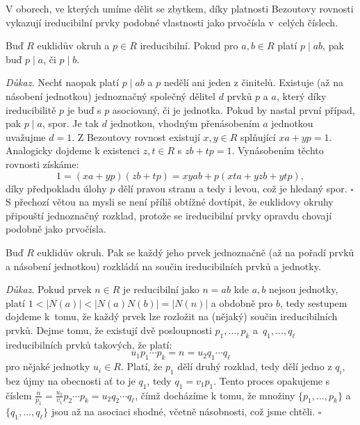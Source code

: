 \documentclass [12pt]{report}
\begin{document}
V oborech, ve kterých umíme dělit se zbytkem, díky platnosti Bezoutovy rovnosti vykazují ireducibilní prvky podobné vlastnosti jako prvočísla v~celých číslech.

\begin{veta}
Buď $R$ euklidův okruh a $p \in R$ ireducibilní. Pokud pro $a,b \in R$ platí $p \mid ab$, pak buď $p \mid a$, či $p \mid b$.
\end{veta}
\noindent \textit{Důkaz.} Nechť naopak platí $p \mid ab$ a $p$ nedělí ani jeden z činitelů. Existuje (až na násobení jednotkou) jednoznačný společný dělitel $d$ prvků $p$ a $a$, který díky ireducibilitě $p$ je buď s $p$ asociovaný, či je jednotka. Pokud by nastal první případ, pak $p \mid a$, spor. Je tak $d$ jednotkou, vhodným přenásobením $a$ jednotkou uvažujme $d = 1$. Z Bezoutovy rovnost existují $x,y \in R$ splňující $xa+yp = 1$. Analogicky dojdeme k existenci $z,t \in R$ s $zb+tp = 1$. Vynásobením těchto rovnosti získáme:
\begin{equation*}
1 = (xa+yp)(zb+tp) = xyab + p(xta+yzb+ytp),
\end{equation*}
díky předpokladu úlohy $p$ dělí pravou stranu a tedy i levou, což je hledaný spor. \hfill $\square$\\

S přechozí větou na mysli se není příliš obtížné dovtípit, že euklidovy okruhy připouští jednoznačný rozklad, protože se ireducibilní prvky opravdu chovají podobně jako prvočísla.
\begin{dusledek}
Buď $R$ euklidův okruh. Pak se každý jeho prvek jednoznačně (až na pořadí prvků a násobení jednotkou) rozkládá na součin ireducibilních prvků a jednotky.
\end{dusledek}
\noindent \textit{Důkaz}. Pokud prvek $n \in R$ je reducibilní jako $n = ab$ kde $a,b$ nejsou jednotky, platí $1 < \vert N(a) \vert < \vert N(a)N(b)\vert = \vert N(n)\vert$ a obdobně pro $b$, tedy sestupem dojdeme k~tomu, že každý prvek lze rozložit na (nějaký) součin ireducibilních prvků. Dejme tomu, že existují dvě posloupnosti $p_1, \dots, p_k$ a~$q_1,\dots, q_{\ell}$ ireducibilních prvků takových, že platí:
\begin{equation*}
u_1 p_1 \cdots p_k = n = u_2 q_1 \cdots q_{\ell}
\end{equation*}
pro nějaké jednotky $u_i \in R$. Platí, že $p_1$ dělí druhý rozklad, tedy dělí jedno z $q_i$, bez újmy na obecnosti ať to je $q_1$, tedy $q_1 = v_1 p_1$. Tento proces opakujeme s číslem $\frac{n}{p_1} =\frac{u_1}{v_1} p_2 \cdots p_k = u_2 q_2 \cdots q_{\ell}$, čímž docházíme k tomu, že množiny $\lbrace p_1, \dots, p_k \rbrace$ a $\lbrace q_1,\dots,q_{\ell} \rbrace$ jsou až na asociaci shodné, včetně násobnosti, což jsme chtěli. \hfill $\square$\\
 
\end{document}
